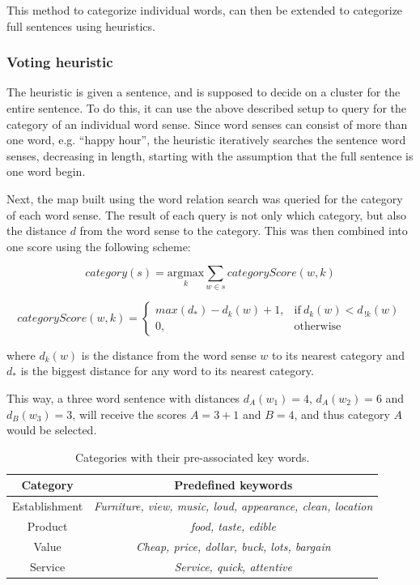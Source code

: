 \documentclass[a4paper,11pt]{kth-mag}
\begin{document}
This method to categorize individual words, can then be extended to categorize full sentences using heuristics.

\subsubsection{Voting heuristic}
The heuristic is given a sentence, and is supposed to decide on a cluster for the entire sentence. To do this, it can use the above described setup to query for the category of an individual word sense. Since word senses can consist of more than one word, e.g. ``happy hour'', the heuristic iteratively searches the sentence word senses, decreasing in length, starting with the assumption that the full sentence is one word begin.

Next, the map built using the word relation search was queried for the category of each word sense. The result of each query is not only which category, but also the distance $d$ from the word sense to the category. This was then combined into one score using the following scheme:

\begin{equation} \label{eq:heruistic}
  category(s) =
  \underset{k}{\text{argmax}}
  \sum_{w \in s} categoryScore(w, k)
\end{equation}

\begin{equation} \label{eq:heruistic_d}
  categoryScore(w, k) =
  \begin{cases}
    max(d_*) - d_k(w) + 1, & \text{if}\ d_k(w) < d_{\,!k}(w)\\
    0, & \text{otherwise}
  \end{cases}
\end{equation}

where $d_k(w)$ is the distance from the word sense $w$ to its nearest category and $d_*$ is the biggest distance for any word to its nearest category.

This way, a three word sentence with distances $d_A(w_1)=4$, $d_A(w_2)=6$ and $d_B(w_3)=3$, will receive the scores $A=3+1$ and $B=4$, and thus category $A$ would be selected.


\begin{table}[t]
  \centering
  \begin{tabular}{| c | c |}
    \hline
    \textbf{Category} & \textbf{Predefined keywords}\\ \hline
    Establishment & \emph{Furniture, view, music, loud, appearance, clean, location}\\ \hline
    Product & \emph{food, taste, edible}\\ \hline
    Value & \emph{Cheap, price, dollar, buck, lots, bargain}\\ \hline
    Service & \emph{Service, quick, attentive}\\ \hline
  \end{tabular}
  \caption{Categories with their pre-associated key words.}
  \label{cat_words}
\end{table}
\end{document}
